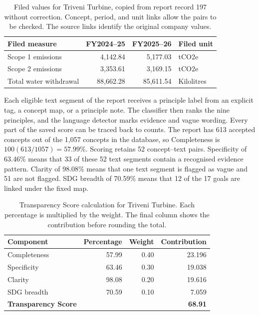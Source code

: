 \begin{table}[tbp]
\centering\small
\caption{Filed values for Triveni Turbine, copied from report record 197 without correction. Concept, period, and unit links allow the pairs to be checked. The source links identify the original company values.}
\label{tab:case_facts}
\begin{tabularx}{\linewidth}{@{}Yrrl@{}}
\toprule\textbf{Filed measure} & \textbf{FY2024--25} & \textbf{FY2025--26} & \textbf{Filed unit}\\\midrule
Scope 1 emissions & 4,142.84 & 5,177.03 & tCO2e\\
Scope 2 emissions & 3,353.61 & 3,169.15 & tCO2e\\
Total water withdrawal & 88,662.28 & 85,611.54 & Kilolitres\\\bottomrule
\end{tabularx}
\end{table}

Each eligible text segment of the report receives a principle label from an explicit tag, a concept map, or a principle note. The classifier then ranks the nine principles, and the language detector marks evidence and vague wording. Every part of the saved score can be traced back to counts. The report has 613 accepted concepts out of the 1,057 concepts in the database, so Completeness is $100(613/1057)=57.99\%$. Scoring retains 52 concept--text pairs. Specificity of 63.46\% means that 33 of these 52 text segments contain a recognised evidence pattern. Clarity of 98.08\% means that one text segment is flagged as vague and 51 are not flagged. SDG breadth of 70.59\% means that 12 of the 17 goals are linked under the fixed map.

\begin{table}[tbp]
\centering\small
\caption{Transparency Score calculation for Triveni Turbine. Each percentage is multiplied by the weight. The final column shows the contribution before rounding the total.}
\label{tab:case_score}
\begin{tabularx}{\linewidth}{@{}Yrrr@{}}
\toprule\textbf{Component} & \textbf{Percentage} & \textbf{Weight} & \textbf{Contribution}\\\midrule
Completeness & 57.99 & 0.40 & 23.196\\
Specificity & 63.46 & 0.30 & 19.038\\
Clarity & 98.08 & 0.20 & 19.616\\
SDG breadth & 70.59 & 0.10 & 7.059\\\midrule
\textbf{Transparency Score} & & & \textbf{68.91}\\\bottomrule
\end{tabularx}
\end{table}

